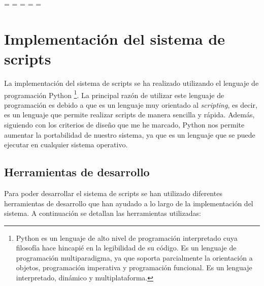 \newpage
\paperwidth=\pdfpageheight
\paperheight=\pdfpagewidth
\pdfpageheight=\paperheight
\pdfpagewidth=\paperwidth
\headwidth=\textwidth

\section{Implementación del sistema de scripts}
\label{sec:implementacion_sistema_scripts}


La implementación del sistema de scripts se ha realizado utilizando el lenguaje de programación Python
\footnote{Python es un lenguaje de alto nivel de programación interpretado cuya filosofía hace hincapié
en la legibilidad de su código. Es un lenguaje de programación multiparadigma, ya que soporta parcialmente
la orientación a objetos, programación imperativa y programación funcional. Es un lenguaje interpretado,
dinámico y multiplataforma. }. La principal razón de utilizar este lenguaje de programación es debido a
que es un lenguaje muy orientado al \textit{scripting}, es decir, es un lenguaje que permite realizar
scripts de manera sencilla y rápida. Además, siguiendo con los criterios de diseño que me he marcado,
Python nos permite aumentar la portabilidad de nuestro sistema, ya que es un lenguaje que se puede ejecutar
en cualquier sistema operativo.

\subsection{Herramientas de desarrollo}
\label{subsec:herramientas_desarrollo}


Para poder desarrollar el sistema de scripts se han utilizado diferentes herramientas de desarrollo que han 
ayudado a lo largo de la implementación del sistema. A continuación se detallan las herramientas utilizadas:

